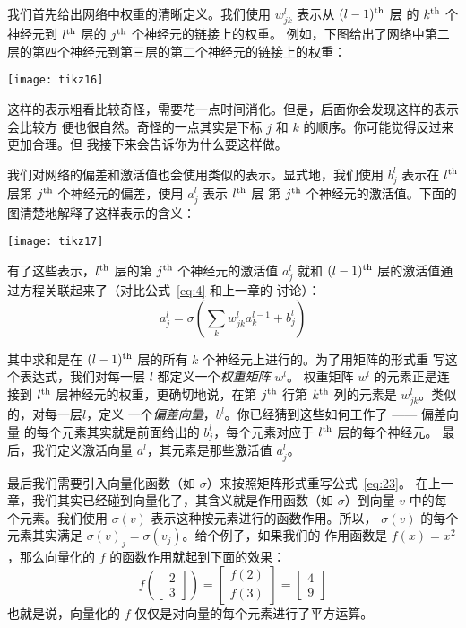 我们首先给出网络中权重的清晰定义。我们使用 $w^l_{jk}$ 表示从 $(l-1)^{\rm th}$ 层
的 $k^{\rm th}$ 个神经元到 $l^{\rm th}$ 层的 $j^{\rm th}$ 个神经元的链接上的权重。
例如，下图给出了网络中第二层的第四个神经元到第三层的第二个神经元的链接上的权重：

\begin{center}
  \texttt{[image: tikz16]}
\end{center}

这样的表示粗看比较奇怪，需要花一点时间消化。但是，后面你会发现这样的表示会比较方
便也很自然。奇怪的一点其实是下标 $j$ 和 $k$ 的顺序。你可能觉得反过来更加合理。但
我接下来会告诉你为什么要这样做。

我们对网络的偏差和激活值也会使用类似的表示。显式地，我们使用 $b^l_j$ 表示在
$l^{\rm th}$ 层第 $j^{\rm th}$ 个神经元的偏差，使用 $a^l_j$ 表示 $l^{\rm th}$ 层
第 $j^{\rm th}$ 个神经元的激活值。下面的图清楚地解释了这样表示的含义：

\begin{center}
  \texttt{[image: tikz17]}
\end{center}

有了这些表示，$l^{\rm th}$ 层的第 $j^{\rm th}$ 个神经元的激活值 $a^{l}_j$ 就和
$(l-1)^{\rm th}$ 层的激活值通过方程关联起来了（对比公式~\eqref{eq:4} 和上一章的
  讨论）：
\begin{equation}
  a^{l}_j = \sigma\left( \sum_k w^{l}_{jk} a^{l-1}_k + b^l_j \right)
  \label{eq:23}\tag{23}
\end{equation}

其中求和是在 $(l-1)^{\rm th}$ 层的所有 $k$ 个神经元上进行的。为了用矩阵的形式重
写这个表达式，我们对每一层 $l$ 都定义一个\emph{权重矩阵} $w^l$。
权重矩阵 $w^l$ 的元素正是连接到 $l^{\rm th}$ 层神经元的权重，更确切地说，在第
$j^{\rm th}$ 行第 $k^{\rm th}$ 列的元素是 $w^l_{jk}$。类似的，对每一层$l$，定义
一个\emph{偏差向量}，$b^l$。你已经猜到这些如何工作了 —— 偏差向量
的每个元素其实就是前面给出的 $b^l_j$，每个元素对应于 $l^{\rm th}$ 层的每个神经元。
最后，我们定义激活向量 $a^l$，其元素是那些激活值 $a^l_j$。

最后我们需要引入向量化函数（如 $\sigma$）来按照矩阵形式重写公式~\eqref{eq:23}。
在上一章，我们其实已经碰到向量化了，其含义就是作用函数（如 $\sigma$）到向量 $v$
中的每个元素。我们使用 $\sigma(v)$ 表示这种按元素进行的函数作用。所以，
$\sigma(v)$ 的每个元素其实满足 $\sigma(v)_j = \sigma(v_j)$。给个例子，如果我们的
作用函数是 $f(x) = x^2$，那么向量化的 $f$ 的函数作用就起到下面的效果：
\begin{equation}
  f\left(\left[ \begin{array}{c} 2 \\ 3 \end{array} \right] \right)
  = \left[ \begin{array}{c} f(2) \\ f(3) \end{array} \right]
  = \left[ \begin{array}{c} 4 \\ 9 \end{array} \right]
\label{eq:24}\tag{24}
\end{equation}
也就是说，向量化的 $f$ 仅仅是对向量的每个元素进行了平方运算。

